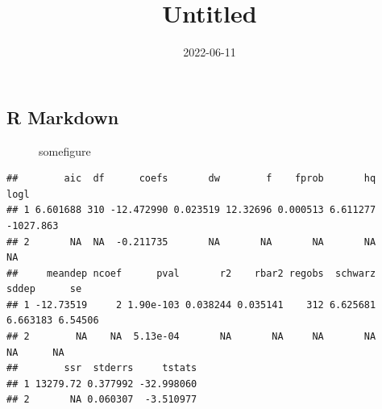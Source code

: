 \documentclass[
]{article}
\title{Untitled}
\author{}
\date{\vspace{-2.5em}2022-06-11}
\begin{document}
\maketitle

{
\setcounter{tocdepth}{2}
\tableofcontents
}
\hypertarget{r-markdown}{%
\subsection{R Markdown}\label{r-markdown}}

\begin{figure}[h]

\hfill{}

\caption{somefigure}\label{fig:mychunk-}
\end{figure}

\begin{verbatim}
##        aic  df      coefs       dw        f    fprob       hq      logl
## 1 6.601688 310 -12.472990 0.023519 12.32696 0.000513 6.611277 -1027.863
## 2       NA  NA  -0.211735       NA       NA       NA       NA        NA
##     meandep ncoef      pval       r2    rbar2 regobs  schwarz    sddep      se
## 1 -12.73519     2 1.90e-103 0.038244 0.035141    312 6.625681 6.663183 6.54506
## 2        NA    NA  5.13e-04       NA       NA     NA       NA       NA      NA
##        ssr  stderrs     tstats
## 1 13279.72 0.377992 -32.998060
## 2       NA 0.060307  -3.510977
\end{verbatim}
\end{document}
